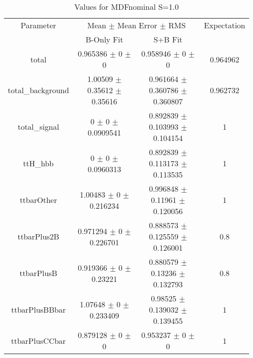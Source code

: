 \begin{table}
\centering
\caption{Values for MDFnominal S=1.0}
\begin{tabular}{cccc}
\toprule
Parameter & \multicolumn{2}{c}{Mean $\pm$ Mean Error $\pm$ RMS} & Expectation\\
 & B-Only Fit & S+B Fit & \\
\midrule
total & \num{0.965386} $\pm$ \num{0} $\pm$ \num{0} & \num{0.958946} $\pm$ \num{0} $\pm$ \num{0} & \num{0.964962}\\
total\_background & \num{1.00509} $\pm$ \num{0.35612} $\pm$ \num{0.35616} & \num{0.961664} $\pm$ \num{0.360786} $\pm$ \num{0.360807} & \num{0.962732}\\
total\_signal & \num{0} $\pm$ \num{0} $\pm$ \num{0.0909541} & \num{0.892839} $\pm$ \num{0.103993} $\pm$ \num{0.104154} & \num{1}\\
ttH\_hbb & \num{0} $\pm$ \num{0} $\pm$ \num{0.0960313} & \num{0.892839} $\pm$ \num{0.113173} $\pm$ \num{0.113535} & \num{1}\\
ttbarOther & \num{1.00483} $\pm$ \num{0} $\pm$ \num{0.216234} & \num{0.996848} $\pm$ \num{0.11961} $\pm$ \num{0.120056} & \num{1}\\
ttbarPlus2B & \num{0.971294} $\pm$ \num{0} $\pm$ \num{0.226701} & \num{0.888573} $\pm$ \num{0.125559} $\pm$ \num{0.126001} & \num{0.8}\\
ttbarPlusB & \num{0.919366} $\pm$ \num{0} $\pm$ \num{0.23221} & \num{0.880579} $\pm$ \num{0.13236} $\pm$ \num{0.132793} & \num{0.8}\\
ttbarPlusBBbar & \num{1.07648} $\pm$ \num{0} $\pm$ \num{0.233409} & \num{0.98525} $\pm$ \num{0.139032} $\pm$ \num{0.139455} & \num{1}\\
ttbarPlusCCbar & \num{0.879128} $\pm$ \num{0} $\pm$ \num{0} & \num{0.953237} $\pm$ \num{0} $\pm$ \num{0} & \num{1}\\
\bottomrule
\end{tabular}
\end{table}